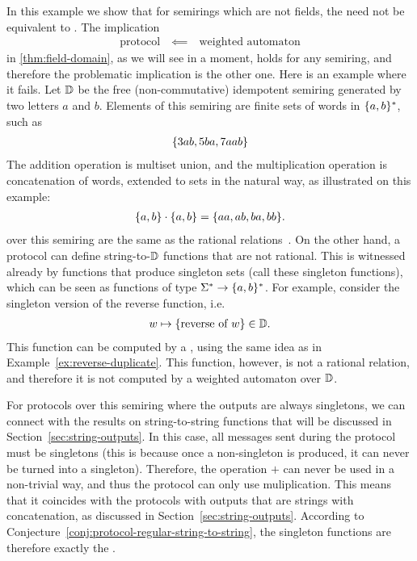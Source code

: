 \begin{myexample}
    \label{ex:non-commutative-semirings} 
    In this example we show that for semirings which are not fields, the  need not be equivalent to . The implication 
    \begin{align*}
    \text{protocol} \quad \impliedby \quad \text{weighted automaton}
    \end{align*}
    in \cref{thm:field-domain}, as we will see in a moment, holds for any
    semiring, and therefore the problematic implication is the other one. Here
    is an example where it fails. Let $\mathbb D$ be  the free (non-commutative)
    idempotent semiring generated by two letters $a$ and $b$. Elements of this
    semiring are finite sets of words in $\{a,b\}^*$, such as 
    \begin{align*}
    \{3ab, 5ba, 7aab\}
    \end{align*}
    The addition operation is multiset union, 
    and the multiplication operation is concatenation of words, 
    extended to sets in the natural way, as illustrated on this example:
    \begin{align*}
    \{a,b\}\cdot \{a,b\} = \{aa, ab, ba, bb\}.
    \end{align*}
     over this semiring are the same as the 
    rational relations~\cite[Chapter IX]{Eilenberg74}. 
    On the other hand, a protocol can define string-to-$\mathbb D$ functions
    that are not rational. This is witnessed already by functions that produce 
    singleton sets (call these singleton functions), which can be seen as 
    functions of type $\Sigma^* \to \{a,b\}^*$. For example, consider 
    the singleton version of the  reverse function, i.e.
    \begin{align*}
    w \mapsto \{\text{reverse of $w$}\} \in \mathbb D.
    \end{align*}
    This function can be computed by a , using the same idea as in 
    Example~\ref{ex:reverse-duplicate}. This function, however, is not
    a rational relation, and therefore it is not computed by a weighted automaton over $\mathbb D$. 

    For protocols over this semiring where the outputs are always singletons, we can connect with the results on string-to-string functions that will be discussed in Section~\ref{sec:string-outputs}.
In this case, all messages sent during the protocol must be singletons (this is because once a non-singleton is produced, it can never be turned into a singleton). Therefore, the operation $+$ can never be used in a non-trivial way, and thus the protocol can only use muliplication. This means that it coincides with the protocols with outputs that are strings with concatenation, as discussed in Section~\ref{sec:string-outputs}. According to Conjecture~\ref{conj:protocol-regular-string-to-string}, the singleton functions are therefore exactly the .
\end{myexample}

